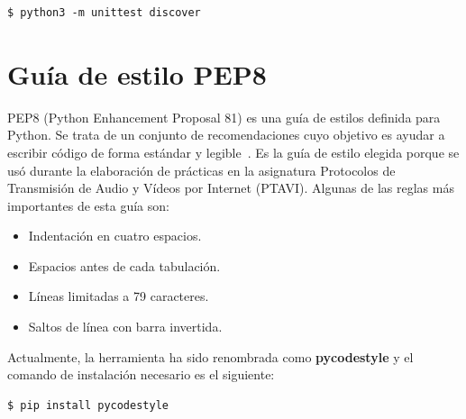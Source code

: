 \documentclass[a4paper, 12pt]{book}
\begin{document}
\begin{lstlisting}[style=consola,numbers=none]
$ python3 -m unittest discover
\end{lstlisting}

\section{Guía de estilo PEP8} 
\label{sec:pep8}

PEP8 (Python Enhancement Proposal 81) es una guía de estilos definida para Python. Se trata de un conjunto de recomendaciones cuyo objetivo es ayudar a escribir código de forma estándar y legible~\cite{pep8Web}. Es la guía de estilo elegida porque se usó durante la elaboración de prácticas en la asignatura Protocolos de Transmisión de Audio y Vídeos por Internet (PTAVI). Algunas de las reglas más importantes de esta guía son:

\begin{itemize}
	\item Indentación en cuatro espacios.
	\item Espacios antes de cada tabulación.
	\item Líneas limitadas a 79 caracteres.
	\item Saltos de línea con barra invertida.
\end{itemize}

Actualmente, la herramienta ha sido renombrada como \textbf{pycodestyle} y el comando de instalación necesario es el siguiente:

\begin{lstlisting}[style=consola,numbers=none]
$ pip install pycodestyle
\end{lstlisting}



\end{document}
